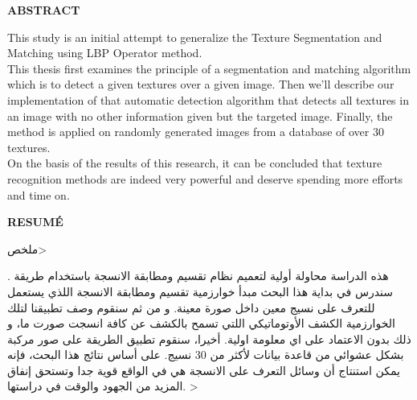 \renewcommand{\headrulewidth}{0pt}


\begin{center}
\begin{Huge}
\textbf{ABSTRACT}\\

\end{Huge}
\end{center}

This study is an initial attempt to generalize the Texture Segmentation and Matching using LBP Operator method. \\

This thesis first examines the principle of a segmentation and matching algorithm which is to detect a given textures over a given image. 
Then we'll describe our implementation of that automatic detection algorithm that detects all textures in an image with no other information given but the targeted image.
Finally, the method is applied on randomly generated images from a database of over 30 textures.\\

On the basis of the results of this research, it can be concluded that texture recognition methods are indeed very powerful and deserve spending more efforts and time on.\\



\begin{center}
\begin{Huge}
\textbf{RESUMÉ}\\

\end{Huge}
\end{center}


\begin{center}
\begin{Huge}
\<ملخص>\\
\end{Huge}
\end{center}


 \<
 هذه الدراسة محاولة أولية لتعميم نظام تقسيم ومطابقة الانسجة باستخدام طريقة  .
  سندرس في بداية هذا البحث مبدأ خوارزمية تقسيم ومطابقة الانسجة اللذي  يستعمل للتعرف على نسيج معين داخل صورة معينة.
  و من ثم سنقوم وصف تطبيقنا لتلك الخوارزمية الكشف الأوتوماتيكي اللتي تسمح بالكشف عن كافة انسجت صورت ما، و ذلك بدون الاعتماد على اي معلومة اولية.
 أخيرا، سنقوم تطبيق الطريقة على صور مركبة  بشكل عشوائي من قاعدة بيانات لأكثر من 30 نسيج.
على أساس نتائج هذا البحث، فإنه يمكن استنتاج أن وسائل التعرف على الانسجة هي في الواقع قوية جدا وتستحق إنفاق المزيد من الجهود والوقت في دراستها.
>
